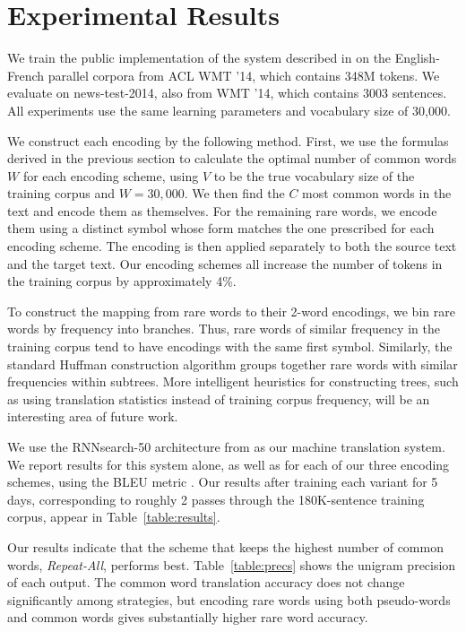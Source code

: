\section{Experimental Results}
\label{sec:exp}

We train the public implementation of the system described in
 on the English-French parallel corpora
from ACL WMT '14, which contains 348M tokens. We evaluate on news-test-2014,
also from WMT '14, which contains 3003 sentences. All experiments use the same
learning parameters and vocabulary size of 30,000.

We construct each encoding by the following method. First, we use the formulas
derived in the previous section to calculate the optimal number of common words
$W$ for each encoding scheme, using $V$ to be the true vocabulary size of the
training corpus and $W = 30,000$. We then find the $C$ most common words in the
text and encode them as themselves. For the remaining rare words, we encode
them using a distinct symbol whose form matches the one prescribed for each
encoding scheme. The encoding is then applied separately to both the source
text and the target text. Our encoding schemes all increase the number of
tokens in the training corpus by approximately 4\%.

To construct the mapping from rare words to their 2-word encodings, we bin rare
words by frequency into branches. Thus, rare words of similar frequency in the
training corpus tend to have encodings with the same first symbol. Similarly, the
standard Huffman construction algorithm groups together rare words with similar
frequencies within subtrees. More intelligent heuristics for constructing trees,
such as using translation statistics instead of training corpus frequency, will be
an interesting area of future work.

We use the RNNsearch-50 architecture from 
as our machine translation system. We report results for this system alone, as
well as for each of our three encoding schemes, using the BLEU metric
\cite{bleu}. Our results after training each variant for 5 days, corresponding to
roughly 2 passes through the 180K-sentence training corpus, appear in
Table~\ref{table:results}.

Our results indicate that the scheme that keeps the highest number of common
words, \emph{Repeat-All}, performs best. Table~\ref{table:precs} shows the
unigram precision of each output. The common word translation accuracy does not
change significantly among strategies, but encoding rare words using both
pseudo-words and common words gives substantially higher rare word accuracy.

